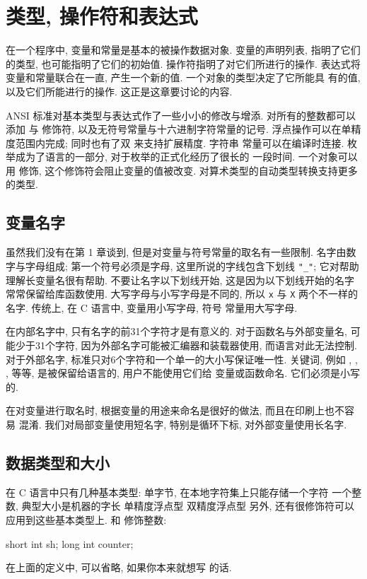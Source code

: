 
\chapter{类型, 操作符和表达式}\label{chap_toe}
在一个程序中, 变量和常量是基本的被操作数据对象. 变量的声明列表,
指明了它们的类型, 也可能指明了它们的初始值. 操作符指明了对它们所进行的操作.
表达式将变量和常量联合在一直, 产生一个新的值. 一个对象的类型决定了它所能具
有的值, 以及它们所能进行的操作. 这正是这章要讨论的内容.

ANSI 标准对基本类型与表达式作了一些小小的修改与增添. 对所有的整数都可以添加
\csigned 与 \cunsigned 修饰符, 以及无符号常量与十六进制字符常量的记号.
浮点操作可以在单精度范围内完成; 同时也有了双 \clong 来支持扩展精度. 字符串
常量可以在编译时连接. 枚举成为了语言的一部分, 对于枚举的正式化经历了很长的
一段时间. 一个对象可以用 \cconst 修饰, 这个修饰符会阻止变量的值被改变.
对算术类型的自动类型转换支持更多的类型.

\section{变量名字}
虽然我们没有在第 1 章谈到, 但是对变量与符号常量的取名有一些限制. 名字由数
字与字母组成; 第一个符号必须是字母, 这里所说的字线包含下划线 \verb'"_"';
它对帮助
理解长变量名很有帮助. 不要让名字以下划线开始, 这是因为以下划线开始的名字
常常保留给库函数使用. 大写字母与小写字母是不同的, 所以 \texttt{x} 与 
\texttt{X} 两个不一样的名字. 传统上, 在 C 语言中, 变量用小写字母, 符号
常量用大写字母.

在内部名字中, 只有名字的前31个字符才是有意义的. 对于函数名与外部变量名,
可能少于31个字符, 因为外部名字可能被汇编器和装载器使用, 而语言对此无法控制.
对于外部名字, 标准只对6个字符和一个单一的大小写保证唯一性. 关键词, 例如
\cif, \celse, \cint, \cfloat 等等, 是被保留给语言的, 用户不能使用它们给
变量或函数命名. 它们必须是小写的.

在对变量进行取名时, 根据变量的用途来命名是很好的做法, 而且在印刷上也不容易
混淆. 我们对局部变量使用短名字, 特别是循环下标, 对外部变量使用长名字.

\section{数据类型和大小}
在 C 语言中只有几种基本类型:
\cchar      单字节, 在本地字符集上只能存储一个字符
\cint       一个整数, 典型大小是机器的字长
\cfloat     单精度浮点型
\cdouble    双精度浮点型
另外, 还有很修饰符可以应用到这些基本类型上. \cshort 和 \clong 修饰整数:
\begin{myverbatim}
    short int   sh;
    long int    counter;
\end{myverbatim}
在上面的定义中, \cint 可以省略, 如果你本来就想写 \cint 的话.

